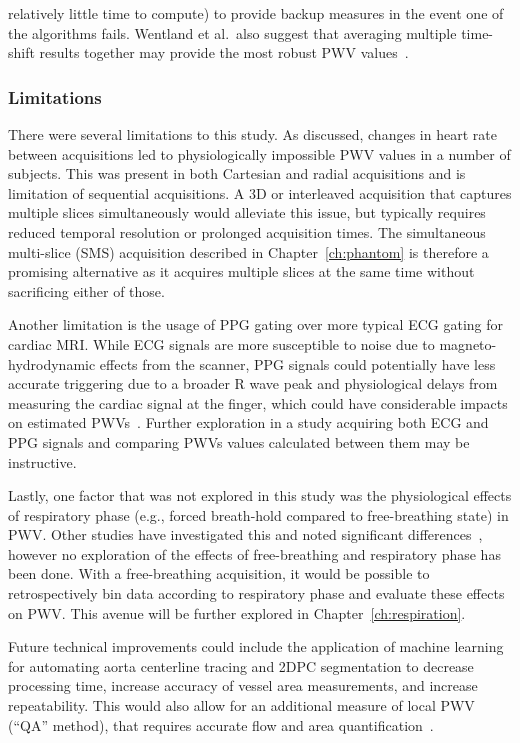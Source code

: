 relatively little time to compute) to provide backup measures in the event one of the algorithms fails. Wentland et al.\ also suggest that averaging multiple time-shift results together may provide the most robust PWV values~\cite{wentlandReviewMRIbasedMeasurements2014}.

\subsubsection{Limitations}
There were several limitations to this study. As discussed, changes in heart rate between acquisitions led to physiologically impossible PWV values in a number of subjects. This was present in both Cartesian and radial acquisitions and is limitation of sequential acquisitions. A 3D or interleaved acquisition that captures multiple slices simultaneously would alleviate this issue, but typically requires reduced temporal resolution or prolonged acquisition times. The simultaneous multi-slice (SMS) acquisition described in Chapter~\ref{ch:phantom} is therefore a promising alternative as it acquires multiple slices at the same time without sacrificing either of those.

Another limitation is the usage of PPG gating over more typical ECG gating for cardiac MRI\@. While ECG signals are more susceptible to noise due to magneto-hydrodynamic effects from the scanner, PPG signals could potentially have less accurate triggering due to a broader R wave peak and physiological delays from measuring the cardiac signal at the finger, which could have considerable impacts on estimated PWVs~\cite{spicherInitialEvaluationProspective2016}. Further exploration in a study acquiring both ECG and PPG signals and comparing PWVs values calculated between them may be instructive.

Lastly, one factor that was not explored in this study was the physiological effects of respiratory phase (e.g., forced breath-hold compared to free-breathing state) in PWV\@. Other studies have investigated this and noted significant differences~\cite{sobolEffectShortTermBreath2019, vainerRadialArteryPulse2023, murphyEFFECTRESPIRATIONPULSE2010}, however no exploration of the effects of free-breathing and respiratory phase has been done. With a free-breathing acquisition, it would be possible to retrospectively bin data according to respiratory phase and evaluate these effects on PWV\@. This avenue will be further explored in Chapter~\ref{ch:respiration}.

Future technical improvements could include the application of machine learning for automating aorta centerline tracing and 2DPC segmentation to decrease processing time, increase accuracy of vessel area measurements, and increase repeatability. This would also allow for an additional measure of local PWV (“QA” method), that requires accurate flow and area quantification~\cite{vulliemozEstimationLocalAortic2002}. 

